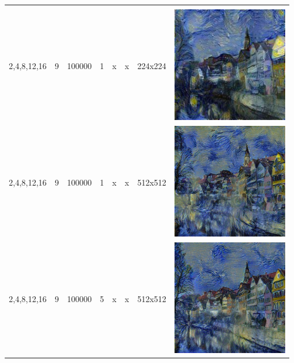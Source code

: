 \documentclass[a4paper, 11pt]{article}
\begin{document}
\begin{longtable}{| m{2.5cm} | m{0.5cm} | m{1.2cm} | m{0.5cm} | m{0.5cm} | m{1cm} | m{1.6cm} | c |}
\begin{minipage}{.3\textwidth}
					\end{minipage} \\
					2,4,8,12,16                         & 9                                   & 100000                            & 1                                   & x                                  & x                             & 224x224                         & 
					\begin{minipage}{.3\textwidth}
						\includegraphics[width=1\linewidth, height=50mm]{pics/image4}
					\end{minipage} \\
					2,4,8,12,16                         & 9                                   & 100000                            & 1                                   & x                                  & x                             & 512x512                         & 
					\begin{minipage}{.3\textwidth}
						\includegraphics[width=1\linewidth, height=50mm]{pics/image6}
					\end{minipage} \\
					2,4,8,12,16                         & 9                                   & 100000                            & 5                                   & x                                  & x                             & 512x512                         & 
					\begin{minipage}{.3\textwidth}
						\includegraphics[width=1\linewidth, height=50mm]{pics/image7}

\end{minipage}
\end{longtable}
\end{document}
